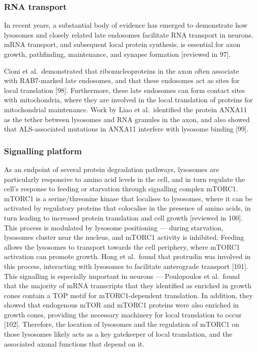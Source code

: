 \documentclass[
  12pt,
  a4paper,
]{book}
\begin{document}
\subsubsection{RNA transport}\label{rna-transport}

In recent years, a substantial body of evidence has emerged to demonstrate how lysosomes and closely related late endosomes facilitate RNA transport in neurons. mRNA transport, and subsequent local protein synthesis, is essential for axon growth, pathfinding, maintenance, and synapse formation {[}reviewed in 97{]}.

Cioni et al.~demonstrated that ribonucleoproteins in the axon often associate with RAB7-marked late endosomes, and that these endosomes act as sites for local translation {[}98{]}. Furthermore, these late endosomes can form contact sites with mitochondria, where they are involved in the local translation of proteins for mitochondrial maintenance. Work by Liao et al.~identified the protein ANXA11 as the tether between lysosomes and RNA granules in the axon, and also showed that ALS-associated mutations in ANXA11 interfere with lysosome binding {[}99{]}.

\subsubsection{Signalling platform}\label{signalling-platform}

As an endpoint of several protein degradation pathways, lysosomes are particularly responsive to amino acid levels in the cell, and in turn regulate the cell's response to feeding or starvation through signalling complex mTORC1. mTORC1 is a serine/threonine kinase that localises to lysosomes, where it can be activated by regulatory proteins that colocalise in the presence of amino acids, in turn leading to increased protein translation and cell growth {[}reviewed in 100{]}. This process is modulated by lysosome positioning --- during starvation, lysosomes cluster near the nucleus, and mTORC1 activity is inhibited. Feeding allows the lysosomes to transport towards the cell periphery, where mTORC1 activation can promote growth. Hong et al.~found that protrudin was involved in this process, interacting with lysosomes to facilitate anterograde transport {[}101{]}. This signalling is especially important in neurons --- Poulopoulos et al.~found that the majority of mRNA transcripts that they identified as enriched in growth cones contain a TOP motif for mTORC1-dependent translation. In addition, they showed that endogenous mTOR and mTORC1 proteins were also enriched in growth cones, providing the necessary machinery for local translation to occur {[}102{]}. Therefore, the location of lysosomes and the regulation of mTORC1 on those lysosomes likely acts as a key gatekeeper of local translation, and the associated axonal functions that depend on it.
\end{document}
